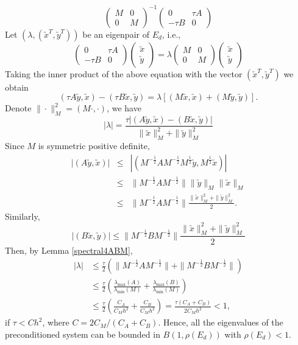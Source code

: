 \documentclass[smallcondensed]{svjour3}
\numberwithin{equation}{section} \numberwithin{table}{section}
\numberwithin{figure}{section}
\numberwithin{algorithm}{section}
\begin{document}
\begin{remark}
\begin{equation}
\begin{pmatrix}
 M & 0\\
 0 & M
\end{pmatrix}^{-1}
\begin{pmatrix}
 0 & \tau A\\
 -\tau B & 0
\end{pmatrix}
\end{equation}
Let $\left(\lambda, (\utilde x^{T}, \utilde y^{T})\right)$ be an eigenpair of $E_d$, i.e.,
\begin{equation*}
\begin{pmatrix}
 0 & \tau A\\
 -\tau B & 0
\end{pmatrix}
\begin{pmatrix}
\utilde x\\
\utilde y
\end{pmatrix}
=\lambda
\begin{pmatrix}
 M & 0\\
 0 & M
\end{pmatrix}
\begin{pmatrix}
\utilde x\\
\utilde y
\end{pmatrix}
\end{equation*}
Taking the inner product of the above equation with the vector $(\utilde x^T, \utilde y^T)$ we obtain 
$$
(\tau A\utilde y,\utilde x) - (\tau B\utilde x, \utilde y) = \lambda \left[(M\utilde x,\utilde x)+(M\utilde y,\utilde y)\right].
$$
Denote $\|\cdot \|_M^2=(M\cdot, \cdot)$, we have
$$
|\lambda| = \frac{\tau\left|(A\utilde y,\utilde x)-(B\utilde x,\utilde y)\right|}{\|\utilde x\|^2_M+\|\utilde y\|^2_M}
$$
Since $M$ is symmetric positive definite,
\begin{eqnarray*}
|(A\utilde y,\utilde x)| &\leq& \left|(M^{-\frac{1}{2}}AM^{-\frac{1}{2}} M^{\frac{1}{2}}\utilde y, M^{\frac{1}{2}}\utilde x)\right|\\
&\leq& \|M^{-\frac{1}{2}}AM^{-\frac{1}{2}}\|\|\utilde y\|_M\|\utilde x\|_M\\
&\leq& \|M^{-\frac{1}{2}}AM^{-\frac{1}{2}} \|\frac{\|\utilde x\|^2_M+\|\utilde y\|^2_M}{2}.
\end{eqnarray*}
Similarly,
$$
|(B\utilde x,\utilde y)| \leq \|M^{-\frac{1}{2}}BM^{-\frac{1}{2}} \|\frac{\|\utilde x\|^2_M+\|\utilde y\|^2_M}{2}
$$
Then, by Lemma \ref{spectral4ABM},
\begin{align*}
|\lambda|&\leq \frac{\tau}{2}(\|M^{-\frac{1}{2}}AM^{-\frac{1}{2}}\|+\|M^{-\frac{1}{2}}BM^{-\frac{1}{2}}\|)\\
&\leq\frac{\tau}{2}\left(\frac{\lambda_{\max}(A)}{\lambda_{\min}(M)}+\frac{\lambda_{\max}(B)}{\lambda_{\min}(M)}\right)\\
&\leq\frac{\tau}{2}\left(\frac{C_A}{C_Mh^2}+\frac{C_B}{C_Mh^2} \right) = \frac{\tau(C_A+C_B)}{2C_Mh^2} < 1,
\end{align*}
if $\tau<Ch^2$, where $C=2C_M/(C_A+C_B)$. Hence, all the eigenvalues of the preconditioned system can be bounded in $B(1, \rho(E_d))$ with $\rho(E_d)<1$.

\end{remark}
\end{document}
